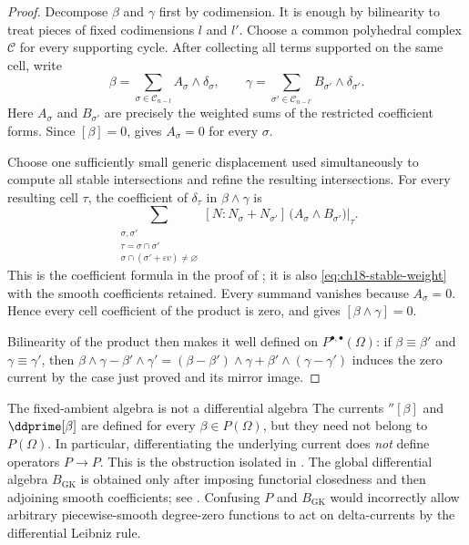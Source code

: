 \begin{proof}
Decompose $\beta$ and $\gamma$ first by codimension.  It is enough by
bilinearity to treat pieces of fixed codimensions $l$ and $l'$.  Choose
a common polyhedral complex $\mathscr C$ for every supporting cycle.
After collecting all terms supported on the same cell, write
\[
 \beta=\sum_{\sigma\in\mathscr C_{n-l}}
             A_\sigma\wedge\delta_\sigma,
 \qquad
 \gamma=\sum_{\sigma'\in\mathscr C_{n-l'}}
             B_{\sigma'}\wedge\delta_{\sigma'} .
\]
Here $A_\sigma$ and $B_{\sigma'}$ are precisely the weighted sums of
the restricted coefficient forms.  Since $[\beta]=0$,
 gives
$A_\sigma=0$ for every $\sigma$.

Choose one sufficiently small generic displacement used simultaneously to
compute all stable intersections and refine the resulting intersections.
For every resulting cell $\tau$, the coefficient of $\delta_\tau$ in
$\beta\wedge\gamma$ is
\[
 \sum_{\substack{\sigma,\sigma'\\
                  \tau=\sigma\cap\sigma'\\
                  \sigma\cap(\sigma'+\varepsilon v)\ne\varnothing}}
 [N:N_\sigma+N_{\sigma'}]\,
 \bigl(A_\sigma\wedge B_{\sigma'}\bigr)\big|_\tau .
\]
This is the coefficient formula in the proof of
\cite[Proposition~2.12(ii)]{GK17}; it is also
\eqref{eq:ch18-stable-weight} with the smooth coefficients retained.
Every summand vanishes because $A_\sigma=0$.  Hence every cell coefficient
of the product is zero, and
 gives
$[\beta\wedge\gamma]=0$.

Bilinearity of the product then makes it well defined on
$P^{\bullet,\bullet}(\Omega)$: if $\beta\equiv\beta'$ and
$\gamma\equiv\gamma'$, then
$\beta\wedge\gamma-\beta'\wedge\gamma'
=(\beta-\beta')\wedge\gamma+\beta'\wedge(\gamma-\gamma')$ induces the zero
current by the case just proved and its mirror image.
\end{proof}

\begin{warning}{The fixed-ambient algebra is not a differential algebra}
\label{rem:ch18-differentials-descend}
The currents $\dprime[\beta]$ and $\ddprime[\beta]$ are defined for every
$\beta\in P(\Omega)$, but they need not belong to $P(\Omega)$.  In
particular, differentiating the underlying current does \emph{not} define
operators $P\to P$.  This is the obstruction isolated in
\cite[Remark~2.17 and Proposition~2.18]{GK17}.  The global differential algebra
$B_{\mathrm{GK}}$ is obtained only after imposing functorial closedness and
then adjoining smooth coefficients; see
.  Confusing $P$ and $B_{\mathrm{GK}}$
would incorrectly allow arbitrary piecewise-smooth degree-zero functions to
act on delta-currents by the differential Leibniz rule.
\end{warning}


